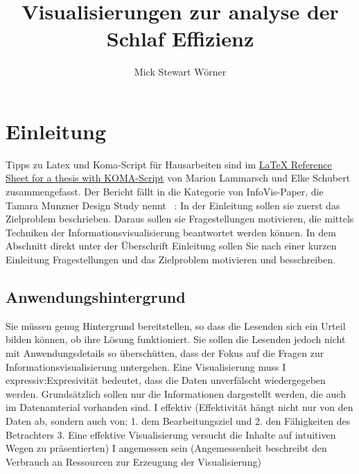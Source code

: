 \documentclass[usegeometry=true]{scrartcl}
\begin{document}
\subject{Projektbericht zum Modul Information Retrieval und Visualisierung Sommersemester 2023}
\title{Visualisierungen zur analyse der Schlaf Effizienz}
\author{Mick Stewart Wörner}%
\maketitle%

\section{Einleitung}
Tipps zu Latex und Koma-Script für Hausarbeiten sind im \href{http://mirrors.ctan.org/info/latex-refsheet/LaTeX_RefSheet.pdf}{LaTeX Reference Sheet for a thesis with KOMA-Script} von Marion Lammarsch und Elke Schubert zusammengefasst. 
Der Bericht fällt in die Kategorie von InfoVis-Paper, die Tamara Munzner Design Study nennt ~\cite{Munzner2008}: In der Einleitung sollen sie zuerst das Zielproblem beschrieben. Daraus sollen sie Fragestellungen motivieren, die mittels Techniken der Informationsvisualisierung beantwortet werden können. In dem Abschnitt direkt unter der Überschrift Einleitung sollen Sie nach einer kurzen Einleitung Fragestellungen und das Zielproblem motivieren und besschreiben. 

\subsection{Anwendungshintergrund}
Sie müssen genug Hintergrund bereitstellen, so dass die Lesenden sich ein Urteil bilden können, ob ihre Lösung funktioniert. Sie sollen die Lesenden jedoch nicht mit Anwendungsdetails so überschütten, dass der Fokus auf die Fragen zur Informationsvisualisierung untergehen. 
Eine Visualisierung muss
I expressiv:Expresivität bedeutet, dass die Daten unverfälscht wiedergegeben werden. Grundsätzlich sollen nur die Informationen dargestellt werden, die auch im Datenamterial vorhanden sind.
I effektiv (Effektivität hängt nicht nur von den Daten ab, sondern auch
von: 1. dem Bearbeitungsziel und 2. den Fähigkeiten des Betrachters 3. Eine effektive Visualisierung versucht die Inhalte auf intuitiven
Wegen zu präsentierten)
I angemessen sein (Angemessenheit beschreibt den Verbrauch an Ressourcen zur
Erzeugung der Visualisierung)
\end{document}
